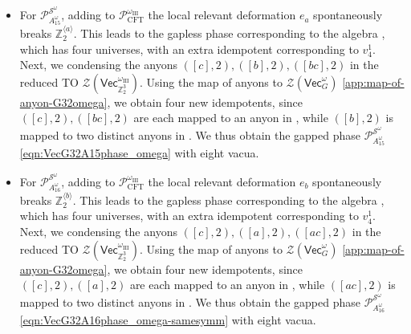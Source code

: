 \documentclass[aps,twocolumn,prx,floatfix,preprintnumbers, nofootinbib,10pt]{revtex4-2}
\numberwithin{equation}{section}
\theoremstyle{definition}
\newcommand{\Z}{{\mathbb Z}}
\newcommand{\cP}{\mathcal{P}}
\newcommand{\cS}{\mathcal{S}}
\newcommand{\cZ}{\mathcal{Z}}
\renewcommand{\Vec}{\mathsf{Vec}}
\newcommand{\III}{\text{III}}
\begin{document}
\begin{itemize}
    \item For $\cP^{\cS^\omega}_{A^\omega_{15}}$, adding to $\cP^{{\omega_{\text{III}}}}_{\text{CFT}}$ the local relevant deformation $e_a$ spontaneously breaks $\Z_2^{\langle a \rangle}$. This leads to the gapless phase corresponding to the algebra , which has four universes, with an extra idempotent corresponding to $v^1_4$. Next, we condensing the anyons $([c],2),([b],2),([bc],2)$ in the reduced TO $\cZ(\Vec_{\Z_2^3}^{\omega_\III})$. Using the map of anyons to $\cZ(\Vec_G^\omega)$ \eqref{app:map-of-anyon-G32omega}, we obtain four new idempotents, since $([c],2),([bc],2)$ are each mapped to an anyon in , while $([b],2)$ is mapped to two distinct anyons in . We thus obtain the gapped phase $\cP^{\cS^\omega}_{A_{15}^\omega}$ \eqref{eqn:VecG32A15phase_omega} with eight vacua.
    
    \item For $\cP^{\cS^\omega}_{A^\omega_{16}}$, adding to $\cP^{{\omega_{\text{III}}}}_{\text{CFT}}$ the local relevant deformation $e_b$ spontaneously breaks $\Z_2^{\langle b \rangle}$. This leads to the gapless phase corresponding to the algebra , which has four universes, with an extra idempotent corresponding to $v^1_4$. Next, we condensing the anyons $([c],2),([a],2),([ac],2)$ in the reduced TO $\cZ(\Vec_{\Z_2^3}^{\omega_\III})$. Using the map of anyons to $\cZ(\Vec_G^\omega)$ \eqref{app:map-of-anyon-G32omega}, we obtain four new idempotents, since $([c],2),([a],2)$ are each mapped to an anyon in , while $([ac],2)$ is mapped to two distinct anyons in . We thus obtain the gapped phase $\cP^{\cS^\omega}_{A_{16}^\omega}$ \eqref{eqn:VecG32A16phase_omega-samesymm} with eight vacua.
    \end{itemize}
\end{document}
